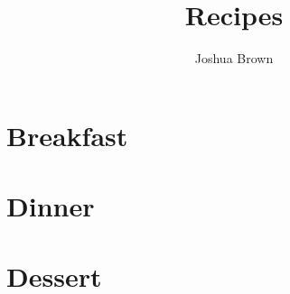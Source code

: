 \documentclass[oneside,11pt]{book}
\title{\bf \Huge Recipes}
\author{Joshua Brown}
\date{}
\begin{document}
\maketitle
\tableofcontents{}

\chapter{Breakfast}
    
    

\chapter{Dinner}
    
    
    
    
    
    

\chapter{Dessert}
    
    
\end{document}
